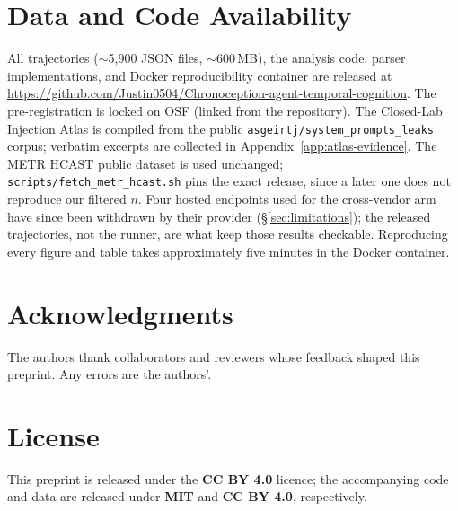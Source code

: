 \documentclass[11pt]{article}
\begin{document}
\section*{Data and Code Availability}
All trajectories ($\sim$5{,}900 JSON files, $\sim$600\,MB), the analysis code, parser implementations, and Docker reproducibility container are released at \url{https://github.com/Justin0504/Chronoception-agent-temporal-cognition}. The pre-registration is locked on OSF (linked from the repository). The Closed-Lab Injection Atlas is compiled from the public \texttt{asgeirtj/system\_prompts\_leaks} corpus; verbatim excerpts are collected in Appendix~\ref{app:atlas-evidence}. The METR HCAST public dataset is used unchanged; \texttt{scripts/fetch\_metr\_hcast.sh} pins the exact release, since a later one does not reproduce our filtered $n$. Four hosted endpoints used for the cross-vendor arm have since been withdrawn by their provider (\S\ref{sec:limitations}); the released trajectories, not the runner, are what keep those results checkable. Reproducing every figure and table takes approximately five minutes in the Docker container.

\section*{Acknowledgments}
The authors thank collaborators and reviewers whose feedback shaped this preprint. Any errors are the authors'.

\section*{License}
This preprint is released under the \textbf{CC BY 4.0} licence; the accompanying code and data are released under \textbf{MIT} and \textbf{CC BY 4.0}, respectively.



\appendix












\end{document}
